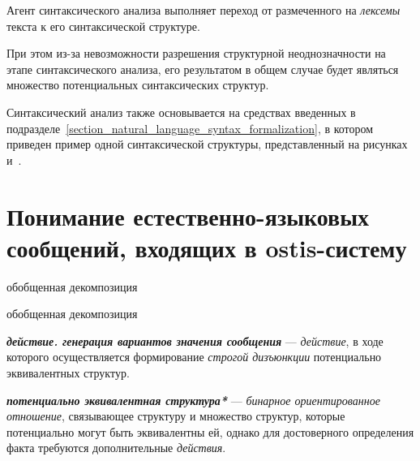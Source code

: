 Агент синтаксического анализа выполняет переход от размеченного на \textit{лексемы} текста к его синтаксической структуре.

При этом из-за невозможности разрешения структурной неоднозначности на этапе синтаксического анализа, его результатом в общем случае будет являться множество потенциальных синтаксических структур.

Синтаксический анализ также основывается на средствах введенных в подразделе~\ref{section_natural_language_syntax_formalization}, в котором приведен пример одной синтаксической структуры, представленный на рисунках~\textit{} и~\textit{}.

\section{Понимание естественно-языковых сообщений, входящих в ostis-систему}
\label{section_natural_language_messages_understanding}

\begin{SCn}

    \begin{scnrelfromset}{обобщенная декомпозиция}
        \begin{scnindent}
            \begin{scnrelfromset}{обобщенная декомпозиция}
            \end{scnrelfromset}
        \end{scnindent}
    \end{scnrelfromset}

\end{SCn}

\textit{\textbf{действие. генерация вариантов значения сообщения}} --- \textit{действие}, в ходе которого осуществляется формирование \textit{строгой дизъюнкции} потенциально эквивалентных структур.

\textit{\textbf{потенциально эквивалентная структура*}} --- \textit{бинарное ориентированное отношение}, связывающее структуру и множество структур, которые потенциально могут быть эквивалентны ей, однако для достоверного определения факта требуются дополнительные \textit{действия}.

